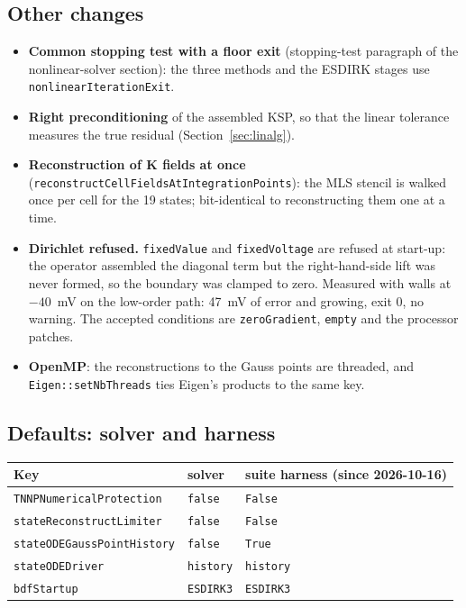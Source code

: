 \documentclass[11pt,a4paper]{article}
\newcommand{\code}[1]{\texttt{\small #1}}
\begin{document}
\subsection{Other changes}

\begin{itemize}
  \item \textbf{Common stopping test with a floor exit} (stopping-test paragraph
        of the nonlinear-solver section): the three methods and the ESDIRK
        stages use \code{nonlinearIterationExit}.
  \item \textbf{Right preconditioning} of the assembled KSP, so that the linear
        tolerance measures the true residual (Section~\ref{sec:linalg}).
  \item \textbf{Reconstruction of K fields at once}
        (\code{reconstructCellFieldsAtIntegrationPoints}): the MLS stencil is
        walked once per cell for the 19 states; bit-identical to reconstructing
        them one at a time.
  \item \textbf{Dirichlet refused.} \code{fixedValue} and \code{fixedVoltage} are
        refused at start-up: the operator assembled the diagonal term but the
        right-hand-side lift was never formed, so the boundary was clamped to
        zero. Measured with walls at $-40$~mV on the low-order path: 47~mV of
        error and growing, exit 0, no warning. The accepted conditions are
        \code{zeroGradient}, \code{empty} and the processor patches.
  \item \textbf{OpenMP}: the reconstructions to the Gauss points are threaded, and
        \code{Eigen::setNbThreads} ties Eigen's products to the same key.
\end{itemize}

\subsection{Defaults: solver and harness}

\begin{center}
\begin{tabular}{@{}lll@{}}
\toprule
Key & solver & suite harness (since 2026-10-16) \\
\midrule
\code{TNNPNumericalProtection} & \code{false} & \code{False} \\
\code{stateReconstructLimiter} & \code{false} & \code{False} \\
\code{stateODEGaussPointHistory} & \code{false} & \code{True} \\
\code{stateODEDriver} & \code{history} & \code{history} \\
\code{bdfStartup} & \code{ESDIRK3} & \code{ESDIRK3} \\
\bottomrule
\end{tabular}
\end{center}
\end{document}
